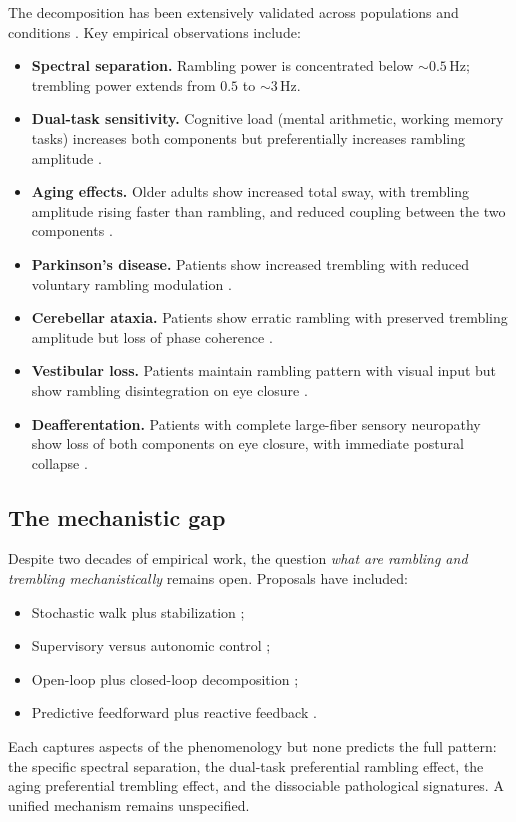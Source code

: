 \documentclass[11pt,twocolumn,a4paper]{article}
\theoremstyle{definition}
\theoremstyle{remark}
\begin{document}
The decomposition has been extensively validated across populations
and conditions \citep{duarte2008,slobounov2005,zatsiorsky2003}.
Key empirical observations include:
\begin{itemize}[leftmargin=*,itemsep=2pt]
\item \textbf{Spectral separation.} Rambling power is concentrated
below $\sim 0.5$\,Hz; trembling power extends from $0.5$ to
$\sim 3$\,Hz.
\item \textbf{Dual-task sensitivity.} Cognitive load (mental
arithmetic, working memory tasks) increases both components but
preferentially increases rambling amplitude \citep{lajoie1993,%
woollacott2002,pellecchia2003}.
\item \textbf{Aging effects.} Older adults show increased total
sway, with trembling amplitude rising faster than rambling, and
reduced coupling between the two components \citep{prieto1996,%
maurer2005}.
\item \textbf{Parkinson's disease.} Patients show increased
trembling with reduced voluntary rambling modulation
\citep{mancini2012}.
\item \textbf{Cerebellar ataxia.} Patients show erratic rambling
with preserved trembling amplitude but loss of phase coherence
\citep{van2011ataxia}.
\item \textbf{Vestibular loss.} Patients maintain rambling pattern
with visual input but show rambling disintegration on eye closure
\citep{horak2006}.
\item \textbf{Deafferentation.} Patients with complete
large-fiber sensory neuropathy show loss of both components on eye
closure, with immediate postural collapse \citep{cole1991,lajoie1996}.
\end{itemize}

\subsection{The mechanistic gap}

Despite two decades of empirical work, the question \emph{what are
rambling and trembling mechanistically} remains open. Proposals
have included:
\begin{itemize}[leftmargin=*,itemsep=1pt]
\item Stochastic walk plus stabilization
\citep{collins1993,chow2000};
\item Supervisory versus autonomic control
\citep{loram2002,masani2003};
\item Open-loop plus closed-loop decomposition
\citep{zatsiorsky2000,collins1994};
\item Predictive feedforward plus reactive feedback
\citep{peterka2002,jeka2004}.
\end{itemize}
Each captures aspects of the phenomenology but none predicts the
full pattern: the specific spectral separation, the dual-task
preferential rambling effect, the aging preferential trembling
effect, and the dissociable pathological signatures. A unified
mechanism remains unspecified.
\end{document}

